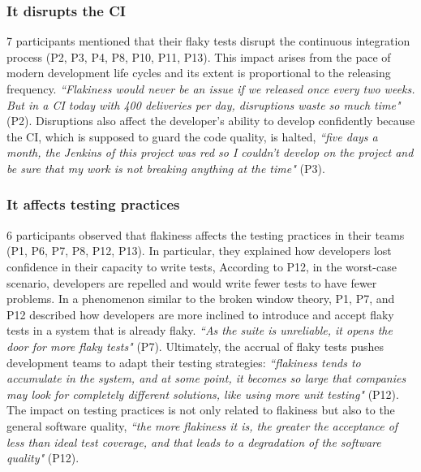 \subsubsection{\textbf{It disrupts the CI}}
7 participants mentioned that their flaky tests disrupt the continuous integration process (P2, P3, P4, P8, P10, P11, P13).
This impact arises from the pace of modern development life cycles and its extent is proportional to the releasing frequency. 
\textit{``Flakiness would never be an issue if we released once every two weeks. But in a CI today with 400 deliveries per day, disruptions waste so much time"} (P2).
Disruptions also affect the developer's ability to develop confidently because the CI, which is supposed to guard the code quality, is halted,
\textit{``five days a month, the Jenkins of this project was red so I couldn't develop on the project and be sure that my work is not breaking anything at the time"} (P3).

\subsubsection{\textbf{It affects testing practices}}
6 participants observed that flakiness affects the testing practices in their teams (P1, P6, P7, P8, P12, P13).
In particular, they explained how developers lost confidence in their capacity to write tests, 
According to P12, in the worst-case scenario, developers are repelled and would write fewer tests to have fewer problems.
In a phenomenon similar to the broken window theory, P1, P7, and P12 described how developers are more inclined to introduce and accept flaky tests in a system that is already flaky.
\textit{``As the suite is unreliable, it opens the door for more flaky tests"} (P7).
Ultimately, the accrual of flaky tests pushes development teams to adapt their testing strategies: \textit{``flakiness tends to accumulate in the system, and at some point, it becomes so large that companies may look for completely different solutions, like using more unit testing"} (P12).
The impact on testing practices is not only related to flakiness but also to the general software quality, \textit{``the more flakiness it is, the greater the acceptance of less than ideal test coverage, and that leads to a degradation of the software quality"} (P12).




